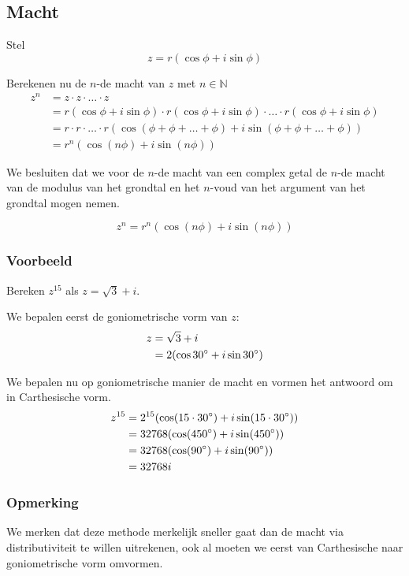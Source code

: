 \documentclass[12pt,twoside,a4]{article}
\begin{document}
\subsection{Macht}

Stel
\[z = r (\cos \phi + i \sin \phi )\]

Berekenen nu de $n$-de macht van $z$ met $n\in\mathbb{N}$
\begin{align*}
  z^n &= z \cdot z \cdot \ldots \cdot z\\
      &= r (\cos \phi + i \sin \phi ) \cdot r (\cos \phi + i \sin \phi ) \cdot \ldots \cdot r (\cos \phi + i \sin \phi )\\
      &= r \cdot r \cdot \ldots \cdot r (\cos( \phi + \phi + \ldots + \phi ) + i \sin( \phi + \phi + \ldots + \phi ))\\
      &= r^n \left(\cos(n\phi) + i\sin(n\phi)\right)
\end{align*}

We besluiten dat we voor de $n$-de macht van een complex getal de $n$-de macht van de modulus van het grondtal en het $n$-voud van het argument van het grondtal mogen nemen.

\begin{mdframed}
  \[
    z^n = r^n \left(\cos(n\phi) + i\sin(n\phi)\right)
  \]
\end{mdframed}

\subsubsection*{Voorbeeld}

Bereken $z^{15}$ als $z=\sqrt{3} + i$.

We bepalen eerst de goniometrische vorm van $z$:
\begin{align*}
  z &= \sqrt{3} + i\\
    &= 2(\cos30^\circ + i\sin30^\circ)
\end{align*}

We bepalen nu op goniometrische manier de macht en vormen het antwoord om in Carthesische vorm.
\begin{align*}
  z^{15} &= 2^{15}(\cos(15 \cdot 30^\circ) + i\sin(15 \cdot 30^\circ))\\
         &= 32768(\cos(450^\circ) + i\sin(450^\circ))\\
         &= 32768(\cos(90^\circ) + i\sin(90^\circ))\\
         &= 32768i
\end{align*}

\subsubsection*{Opmerking}
We merken dat deze methode merkelijk sneller gaat dan de macht via distributiviteit te willen uitrekenen, ook al moeten we eerst van Carthesische naar goniometrische vorm omvormen.
\end{document}
